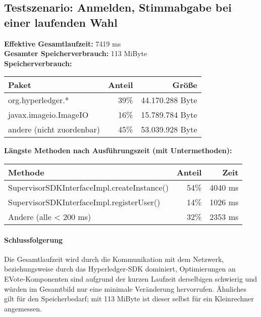 \documentclass[parskip=full]{scrartcl}
\begin{document}
\subsection{Testszenario: Anmelden, Stimmabgabe bei einer laufenden Wahl}
\textbf{Effektive Gesamtlaufzeit:} 7419 ms\\
\textbf{Gesamter Speicherverbrauch:} 113 MiByte \\
\textbf{Speicherverbrauch:}

\begin{table}[h!]
	\begin{tabular}[t]{l r r}
		Paket & Anteil & Größe \\ \hline
		org.hyperledger.* & 39\% & 44.170.288 Byte \\
		javax.imageio.ImageIO & 16\% & 15.789.784 Byte \\
		andere (nicht zuordenbar) & 45\% & 53.039.928 Byte \\
	\end{tabular}
\end{table}
\textbf{Längste Methoden nach Ausführungszeit (mit Untermethoden):}

\begin{table}[h!]
	\begin{tabular}[t]{lrr}
		Methode & Anteil & Zeit \\ \hline
		SupervisorSDKInterfaceImpl.createInstance() & 54\% & 4040 ms \\
		SupervisorSDKInterfaceImpl.registerUser() & 14\% & 1026 ms \\
		Andere (alle < 200 ms) & 32\% & 2353 ms
	\end{tabular}
\end{table}

\paragraph{Schlussfolgerung}
Die Gesamtlaufzeit wird durch die Kommunikation mit dem Netzwerk, beziehungsweise durch das Hyperledger-SDK dominiert, Optimierungen an EVote-Komponenten sind aufgrund der kurzen Laufzeit derselbigen schwierig und würden im Gesamtbild nur eine minimale Veränderung hervorrufen. Ähnliches gilt für den Speicherbedarf; mit 113 MiByte ist dieser selbst für ein Kleinrechner angemessen.
\end{document}
